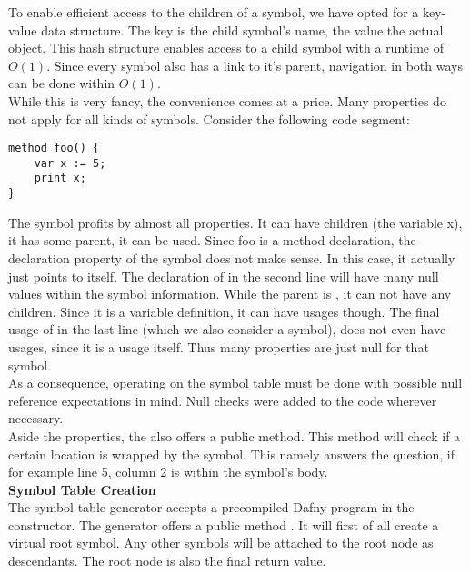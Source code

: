 To enable efficient access to the children of a symbol, we have opted for a key-value data structure.
The key is the child symbol's name, the value the actual  object.
This hash structure enables access to a child symbol with a runtime of $O(1)$.
Since every symbol also has a link to it's parent, navigation in both ways can be done within $O(1)$.\\

While this is very fancy, the convenience comes at a price.
Many properties do not apply for all kinds of symbols.
Consider the following code segment:

\begin{lstlisting}[language=dafny, caption={Example Code Regarding Symbol Information}, captionpos=b, label={lst:aldbkajds}]
method foo() {
    var x := 5;
    print x;
}
\end{lstlisting}

The symbol  profits by almost all properties.
It can have children (the variable x), it has some parent, it can be used.
Since foo is a method declaration, the declaration property of the symbol does not make sense.
In this case, it actually just points to itself.
The declaration of  in the second line will have many null values within the symbol information.
While the parent is , it can not have any children.
Since it is a variable definition, it can have usages though.
The final usage of  in the last line (which we also consider a symbol), does not even have usages, since it is a usage itself.
Thus many properties are just null for that symbol.\\

As a consequence, operating on the symbol table must be done with possible null reference expectations in mind.
Null checks were added to the code wherever necessary.\\

Aside the properties, the  also offers a public method.
This method will check if a certain location is wrapped by the symbol.
This namely answers the question, if for example line 5, column 2 is within the symbol's body.\\

\textbf{Symbol Table Creation}\\
The symbol table generator accepts a precompiled Dafny program in the constructor.
The generator offers a public method .
It will first of all create a virtual root symbol.
Any other symbols will be attached to the root node as descendants.
The root node is also the final return value.\\

